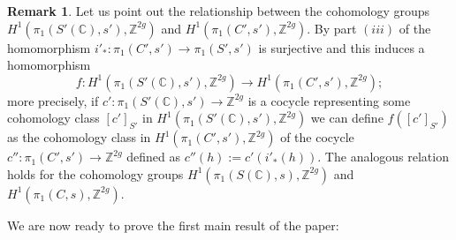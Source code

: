 \documentclass[10 pt,a4paper]{article}
\theoremstyle{plain}
\theoremstyle{definition}
\newtheorem{rem}[thm]{Remark}
\theoremstyle{named}
\newcommand{\bC}{\mathbb C}
\newcommand{\bZ}{\mathbb Z}
\begin{document}
\begin{rem}\label{injectiveCoho}
    Let us point out the relationship between the cohomology groups $H^1(\pi_1(S'(\bC),s'),\bZ^{2g})$ and $H^1(\pi_1(C',s'),\bZ^{2g})$. By part $(iii)$ of  the homomorphism $i'_*: \pi_1(C',s') \to \pi_1(S',s')$ is surjective and this induces a homomorphism
    \[
    f:H^1(\pi_1(S'(\bC),s'),\bZ^{2g}) \to H^1(\pi_1(C',s'),\bZ^{2g});
    \]
    more precisely, if $c': \pi_1(S'(\bC),s') \to \bZ^{2g}$ is a cocycle representing some cohomology class $[c']_{S'}$ in $H^1(\pi_1(S'(\bC),s'),\bZ^{2g})$ we can define $f([c']_{S'})$ as the cohomology class in $H^1(\pi_1(C',s'),\bZ^{2g})$ of the cocycle $c'':\pi_1(C',s') \to \bZ^{2g}$ defined as $c''(h):=c'(i'_*(h))$. The analogous relation holds for the cohomology groups $H^1(\pi_1(S(\bC),s),\bZ^{2g})$ and $H^1(\pi_1(C,s),\bZ^{2g})$.
\end{rem}

We are now ready to prove the first main result of the paper:
\end{document}
